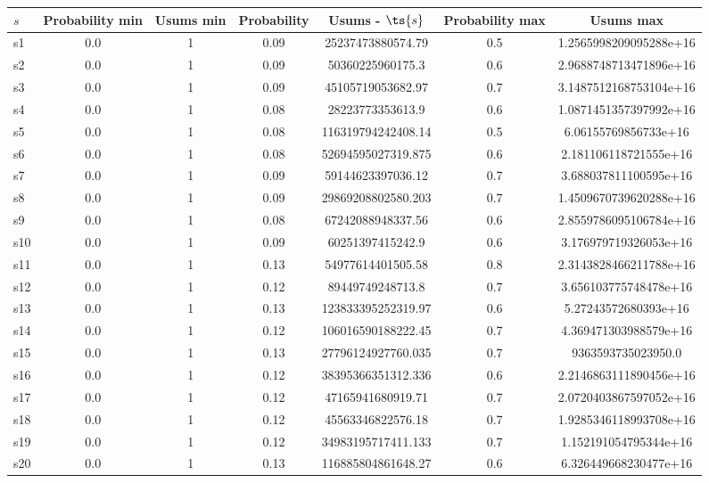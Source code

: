 \documentclass{article}
\begin{document}
\noindent\begin{tabular}{|l|c|c|c|c|c|c|}
\hline
$s$& Probability min & Usums min & Probability & Usums - $\ts{s}$ & Probability max & Usums max\\
\hline
s1 &0.0 & 1 & 0.09 & 25237473880574.79 & 0.5 & 1.2565998209095288e+16\\
\hline
s2 &0.0 & 1 & 0.09 & 50360225960175.3 & 0.6 & 2.9688748713471896e+16\\
\hline
s3 &0.0 & 1 & 0.09 & 45105719053682.97 & 0.7 & 3.1487512168753104e+16\\
\hline
s4 &0.0 & 1 & 0.08 & 28223773353613.9 & 0.6 & 1.0871451357397992e+16\\
\hline
s5 &0.0 & 1 & 0.08 & 116319794242408.14 & 0.5 & 6.06155769856733e+16\\
\hline
s6 &0.0 & 1 & 0.08 & 52694595027319.875 & 0.6 & 2.181106118721555e+16\\
\hline
s7 &0.0 & 1 & 0.09 & 59144623397036.12 & 0.7 & 3.688037811100595e+16\\
\hline
s8 &0.0 & 1 & 0.09 & 29869208802580.203 & 0.7 & 1.4509670739620288e+16\\
\hline
s9 &0.0 & 1 & 0.08 & 67242088948337.56 & 0.6 & 2.8559786095106784e+16\\
\hline
s10 &0.0 & 1 & 0.09 & 60251397415242.9 & 0.6 & 3.176979719326053e+16\\
\hline
s11 &0.0 & 1 & 0.13 & 54977614401505.58 & 0.8 & 2.3143828466211788e+16\\
\hline
s12 &0.0 & 1 & 0.12 & 89449749248713.8 & 0.7 & 3.656103775748478e+16\\
\hline
s13 &0.0 & 1 & 0.13 & 123833395252319.97 & 0.6 & 5.27243572680393e+16\\
\hline
s14 &0.0 & 1 & 0.12 & 106016590188222.45 & 0.7 & 4.369471303988579e+16\\
\hline
s15 &0.0 & 1 & 0.13 & 27796124927760.035 & 0.7 & 9363593735023950.0\\
\hline
s16 &0.0 & 1 & 0.12 & 38395366351312.336 & 0.6 & 2.2146863111890456e+16\\
\hline
s17 &0.0 & 1 & 0.12 & 47165941680919.71 & 0.7 & 2.0720403867597052e+16\\
\hline
s18 &0.0 & 1 & 0.12 & 45563346822576.18 & 0.7 & 1.9285346118993708e+16\\
\hline
s19 &0.0 & 1 & 0.12 & 34983195717411.133 & 0.7 & 1.152191054795344e+16\\
\hline
s20 &0.0 & 1 & 0.13 & 116885804861648.27 & 0.6 & 6.326449668230477e+16\\

\end{tabular}
\end{document}
